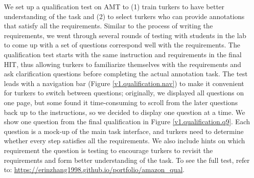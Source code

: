 We set up a qualification test on AMT to (1) train turkers to have better understanding of the task and (2) to select turkers who can provide annotations that satisfy all the requirements. 
Similar to the process of writing the requirements, we went through several rounds of testing with students in the lab to come up with a set of questions correspond well with the requirements. 
The qualification test starts with the same instruction and requirements in the final HIT, thus allowing turkers to familiarize themselves with the requirements and ask clarification questions before completing the actual annotation task. 
The test leads with a navigation bar (Figure \ref{v1.qualification.nav}) to make it convenient for turkers to switch between questions; originally, we displayed all questions on one page, but some found it time-consuming to scroll from the later questions back up to the instructions, so we decided to display one question at a time. 
We show one question from the final qualification in Figure \ref{v1.qualification.q9}. 
Each question is a mock-up of the main task interface, and turkers need to determine whether every step satisfies all the requirements.
We also include hints on which requirement the question is testing to encourage turkers to revisit the requirements and form better understanding of the task.  
To see the full test, refer to: \url{https://erinzhang1998.github.io/portfolio/amazon_qual}.

